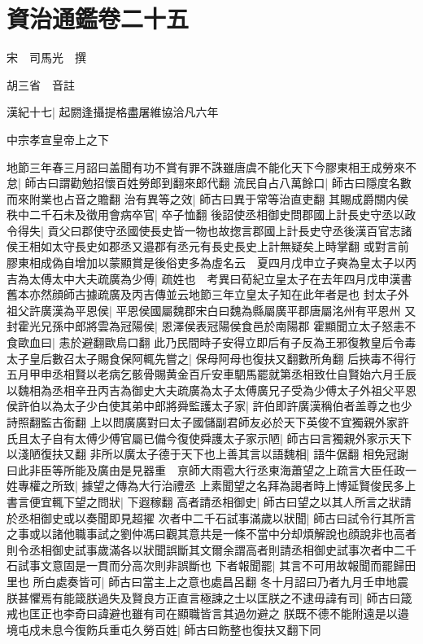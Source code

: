 \section{資治通鑑卷二十五}
宋　司馬光　撰

胡三省　音註

漢紀十七|{
	起閼逢攝提格盡屠維協洽凡六年}


中宗孝宣皇帝上之下

地節三年春三月詔曰盖聞有功不賞有罪不誅雖唐虞不能化天下今膠東相王成勞來不怠|{
	師古曰謂勸勉招懷百姓勞郎到翻來郎代翻}
流民自占八萬餘口|{
	師古曰隱度名數而來附業也占音之贍翻}
治有異等之效|{
	師古曰異于常等治直吏翻}
其賜成爵關内侯秩中二千石未及徵用會病卒官|{
	卒子恤翻}
後詔使丞相御史問郡國上計長史守丞以政令得失|{
	貢父曰郡使守丞國使長史皆一物也故揔言郡國上計長史守丞後漢百官志諸侯王相如太守長史如郡丞又邉郡有丞元有長史長史上計無疑矣上時掌翻}
或對言前膠東相成偽自增加以蒙顯賞是後俗吏多為虛名云　夏四月戊申立子奭為皇太子以丙吉為太傅太中大夫疏廣為少傅|{
	疏姓也　考異曰荀紀立皇太子在去年四月戊申漢書舊本亦然顔師古據疏廣及丙吉傳並云地節三年立皇太子知在此年者是也}
封太子外祖父許廣漢為平恩侯|{
	平恩侯國屬魏郡宋白曰魏為縣屬廣平郡唐屬洺州有平恩州}
又封霍光兄孫中郎將雲為冠陽侯|{
	恩澤侯表冠陽侯食邑於南陽郡}
霍顯聞立太子怒恚不食歐血曰|{
	恚於避翻歐烏口翻}
此乃民間時子安得立即后有子反為王邪復教皇后令毒太子皇后數召太子賜食保阿輒先嘗之|{
	保母阿母也復扶又翻數所角翻}
后挾毒不得行　五月甲申丞相賢以老病乞骸骨賜黄金百斤安車駟馬罷就第丞相致仕自賢始六月壬辰以魏相為丞相辛丑丙吉為御史大夫疏廣為太子太傅廣兄子受為少傅太子外祖父平恩侯許伯以為太子少白使其弟中郎將舜監護太子家|{
	許伯即許廣漢稱伯者盖尊之也少詩照翻監古銜翻}
上以問廣廣對曰太子國儲副君師友必於天下英俊不宜獨親外家許氏且太子自有太傅少傅官屬已備今復使舜護太子家示陋|{
	師古曰言獨親外家示天下以淺陋復扶又翻}
非所以廣太子德于天下也上善其言以語魏相|{
	語牛倨翻}
相免冠謝曰此非臣等所能及廣由是見器重　亰師大雨雹大行丞東海蕭望之上疏言大臣任政一姓專權之所致|{
	據望之傳為大行治禮丞}
上素聞望之名拜為謁者時上博延賢俊民多上書言便宜輒下望之問狀|{
	下遐稼翻}
高者請丞相御史|{
	師古曰望之以其人所言之狀請於丞相御史或以奏聞即見超擢}
次者中二千石試事滿歲以狀聞|{
	師古曰試令行其所言之事或以諸他職事試之劉仲馮曰觀其意共是一條不當中分却煩解說也顔說非也高者則令丞相御史試事歲滿各以狀聞誤斷其文爾余謂高者則請丞相御史試事次者中二千石試事文意固是一貫而分高次則非誤斷也}
下者報聞罷|{
	其言不可用故報聞而罷歸田里也}
所白處奏皆可|{
	師古曰當主上之意也處昌呂翻}
冬十月詔曰乃者九月壬申地震朕甚懼焉有能箴朕過失及賢良方正直言極諫之士以匡朕之不逮毋諱有司|{
	師古曰箴戒也匡正也李奇曰諱避也雖有司在顯職皆言其過勿避之}
朕既不德不能附遠是以邉境屯戍未息今復飭兵重屯久勞百姓|{
	師古曰飭整也復扶又翻下同}
